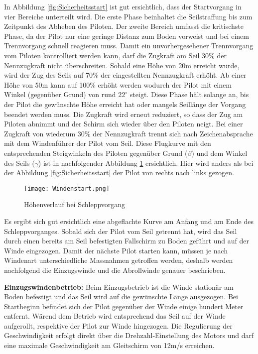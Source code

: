 In Abbildung \ref{fig:Sicherheitsstart} ist gut ersichtlich, dass der Startvorgang in vier Bereiche unterteilt wird. Die erste Phase beinhaltet die Seilstraffung bis zum Zeitpunkt des Abheben des Piloten. Der zweite Bereich umfasst die kritischste Phase, da der Pilot nur eine geringe Distanz zum Boden vorweist und bei einem Trennvorgang schnell reagieren muss. Damit ein unvorhergesehener Trennvorgang vom Piloten kontrolliert werden kann, darf die Zugkraft am Seil 30\% der Nennzugkraft nicht überschreiten. Sobald eine Höhe von 20m erreicht wurde, wird der Zug des Seils auf 70\% der eingestellten Nennzugkraft erhöht. Ab einer Höhe von 50m kann auf 100\% erhöht werden wodurch der Pilot mit einem Winkel (gegenüber Grund) von rund $22^\circ$ steigt. Diese Phase hält solange an, bis der Pilot die gewünschte Höhe erreicht hat oder mangels Seillänge der Vorgang beendet werden muss. Die Zugkraft wird erneut reduziert, so dass der Zug am Piloten abnimmt und der Schirm sich wieder über den Piloten neigt. Bei einer Zugkraft von wiederum 30\% der Nennzugkraft trennt sich nach Zeichenabsprache mit dem Windenführer der Pilot vom Seil. Diese Flugkurve mit den entsprechenden Steigwinkeln des Piloten gegenüber Grund ($\beta$) und dem Winkel des Seils ($\gamma$) ist in nachfolgender Abbildung \ref{fig:HoehenverlaufSchlepp} ersichtlich. Hier wird anders als bei der Abbildung \ref{fig:Sicherheitsstart} der Pilot von rechts nach links gezogen.


\begin{figure}[H]
	\begin{center}
		\texttt{[image: Windenstart.png]}
		\caption{Höhenverlauf bei Schleppvorgang \cite{PhysikWindenschlepp}}
		\label{fig:HoehenverlaufSchlepp}
	\end{center}
\end{figure}

Es ergibt sich gut ersichtlich eine abgeflachte Kurve am Anfang und am Ende des Schleppvorganges. Sobald sich der Pilot vom Seil getrennt hat, wird das Seil durch einen bereits am Seil befestigten Fallschirm zu Boden geführt und auf der Winde eingezogen. Damit der nächste Pilot starten kann, müssen je nach Windenart unterschiedliche Massnahmen getroffen werden, deshalb werden nachfolgend die Einzugswinde und die Abrollwinde genauer beschrieben.


\textbf{Einzugswindenbetrieb:}
Beim Einzugsbetrieb ist die Winde stationär am Boden befestigt und das Seil wird auf die gewünschte Länge ausgezogen. Bei Startbeginn befindet sich der Pilot gegenüber der Winde einige hundert Meter entfernt. Wärend dem Betrieb wird entsprechend das Seil auf der Winde aufgerollt, respektive der Pilot zur Winde hingezogen. Die Regulierung der Geschwindigkeit erfolgt direkt über die Drehzahl-Einstellung des Motors und darf eine maximale Geschwindigkeit am Gleitschirm von 12m/s erreichen.

